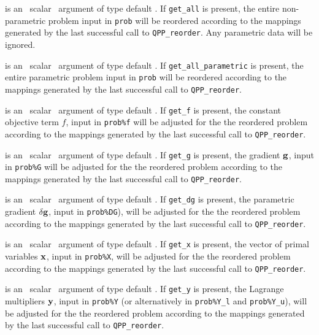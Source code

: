 \documentclass{galahad}
\newcommand{\packagename}{QPP}
\begin{document}
\begin{description}
is an \optional\ scalar \intentin\ argument of type default \logical. 
If {\tt get\_all} is present, the entire non-parametric problem 
input in {\tt prob} will be reordered according to the 
mappings generated by the last successful call to {\tt \packagename\_reorder}. 
Any parametric data will be ignored.

is an \optional\ scalar \intentin\ argument of type default \logical. 
If {\tt get\_all\_parametric} is present, the entire parametric problem 
input in {\tt prob} will be reordered according to the 
mappings generated by the last successful call to {\tt \packagename\_reorder}. 
 
is an \optional\ scalar \intentin\ argument of type default \logical. 
If {\tt get\_f} is present, the constant objective term
$f$, input in {\tt prob\%f} 
will be adjusted for the the reordered problem according to the 
mappings generated by the last successful call to {\tt \packagename\_reorder}. 
 
is an \optional\ scalar \intentin\ argument of type default \logical. 
If {\tt get\_g} is present, the gradient 
${\mathbf{g}}$, input in {\tt prob\%G} 
will be adjusted for the the reordered problem according to the 
mappings generated by the last successful call to {\tt \packagename\_reorder}. 
 
is an \optional\ scalar \intentin\ argument of type default \logical. 
If {\tt get\_dg} is present, the parametric gradient $\delta {\mathbf{g}}$, input in 
{\tt prob\%DG}),
will be adjusted for the the reordered problem according to the 
mappings generated by the last successful call to {\tt \packagename\_reorder}. 
 
is an \optional\ scalar \intentin\ argument of type default \logical. 
If {\tt get\_x} is present, the vector of primal variables ${\mathbf{x}}$, 
input in {\tt prob\%X}, will be 
adjusted for the the reordered problem according to the 
mappings generated by the last successful call to {\tt \packagename\_reorder}. 
 
is an \optional\ scalar \intentin\ argument of type default \logical. 
If {\tt get\_y} is present, the 
Lagrange multipliers ${\mathbf{y}}$, input in {\tt prob\%Y}
(or alternatively in {\tt prob\%Y\_l} and {\tt prob\%Y\_u}), 
will be adjusted for the the reordered problem according to the 
mappings generated by the last successful call to {\tt \packagename\_reorder}. 


\end{description}
\end{document}
